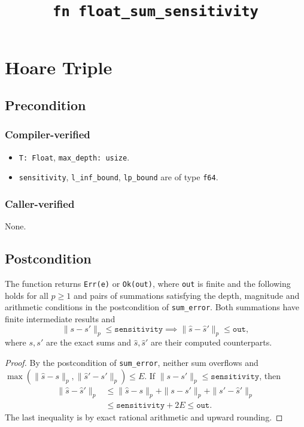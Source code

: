 \documentclass{article}
\title{\texttt{fn float\_sum\_sensitivity}}
\author{\MichaelShoemateAuthor}
\begin{document}
\maketitle
\contrib

\section{Hoare Triple}
\subsection*{Precondition}
\subsubsection*{Compiler-verified}
\begin{itemize}
    \item \texttt{T: Float}, \texttt{max\_depth: usize}.
    \item \texttt{sensitivity}, \texttt{l\_inf\_bound}, \texttt{lp\_bound} are of type \texttt{f64}.
\end{itemize}

\subsubsection*{Caller-verified}
None.

\subsection*{Postcondition}
\begin{theorem}
    The function returns \texttt{Err(e)} or \texttt{Ok(out)}, where
    \texttt{out} is finite and the following holds for all $p\ge1$
    and pairs of summations satisfying the depth, magnitude and
    arithmetic conditions in the postcondition of \texttt{sum\_error}.
    Both summations have finite intermediate results and
    \[
        \|s-s'\|_p\le\texttt{sensitivity}
        \implies \|\widehat{s}-\widehat{s}'\|_p\le\texttt{out},
    \]
    where $s,s'$ are the exact sums and $\widehat{s},\widehat{s}'$ are
    their computed counterparts.
\end{theorem}

\begin{proof}
    By the postcondition of \texttt{sum\_error}, neither sum overflows and
    $\max(\|\widehat{s}-s\|_p,\|\widehat{s}'-s'\|_p)\le E$.
    If $\|s-s'\|_p\le\texttt{sensitivity}$, then
    \begin{align*}
        \|\widehat{s}-\widehat{s}'\|_p
        &\le\|\widehat{s}-s\|_p+\|s-s'\|_p+\|s'-\widehat{s}'\|_p\\
        &\le\texttt{sensitivity}+2E
        \le\texttt{out}.
    \end{align*}
    The last inequality is by exact rational arithmetic and upward rounding.
\end{proof}
\end{document}
